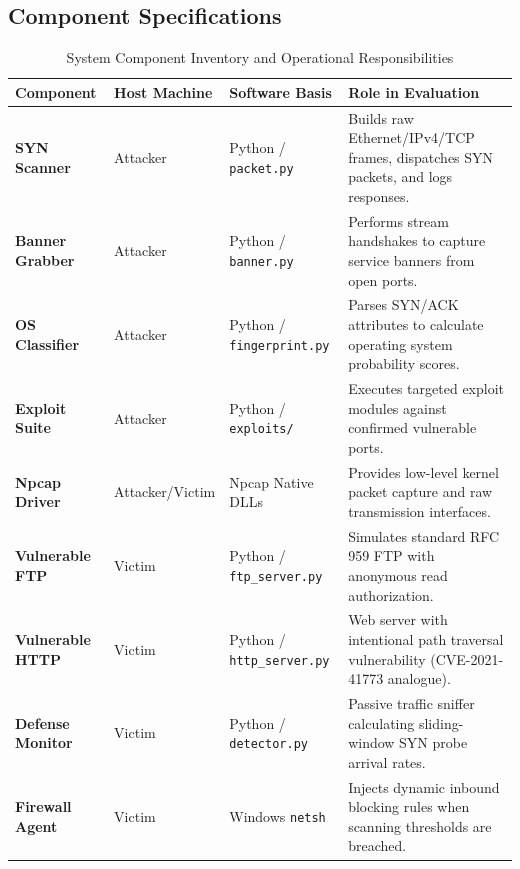 \documentclass[11pt,a4paper]{article}
\begin{document}
\subsection{Component Specifications}
\begin{table}[H]
\centering
\small
\renewcommand{\arraystretch}{1.24}
\caption{System Component Inventory and Operational Responsibilities}
\label{tab:components}
\begin{tabularx}{\textwidth}{>{\raggedright\arraybackslash\bfseries}p{2.8cm} >{\raggedright\arraybackslash}p{2.2cm} >{\raggedright\arraybackslash}p{4.2cm} >{\raggedright\arraybackslash}X}
\toprule
\textbf{Component} & \textbf{Host Machine} & \textbf{Software Basis} & \textbf{Role in Evaluation} \\
\midrule
SYN Scanner & Attacker & Python / \texttt{packet.py} & Builds raw Ethernet/IPv4/TCP frames, dispatches SYN packets, and logs responses. \\
\rowcolor{lightbg}
Banner Grabber & Attacker & Python / \texttt{banner.py} & Performs stream handshakes to capture service banners from open ports. \\
OS Classifier & Attacker & Python / \texttt{fingerprint.py} & Parses SYN/ACK attributes to calculate operating system probability scores. \\
\rowcolor{lightbg}
Exploit Suite & Attacker & Python / \texttt{exploits/} & Executes targeted exploit modules against confirmed vulnerable ports. \\
Npcap Driver & Attacker/Victim & Npcap Native DLLs & Provides low-level kernel packet capture and raw transmission interfaces. \\
\rowcolor{lightbg}
Vulnerable FTP & Victim & Python / \texttt{ftp\_server.py} & Simulates standard RFC 959 FTP with anonymous read authorization. \\
Vulnerable HTTP & Victim & Python / \texttt{http\_server.py} & Web server with intentional path traversal vulnerability (CVE-2021-41773 analogue). \\
\rowcolor{lightbg}
Defense Monitor & Victim & Python / \texttt{detector.py} & Passive traffic sniffer calculating sliding-window SYN probe arrival rates. \\
Firewall Agent & Victim & Windows \texttt{netsh} & Injects dynamic inbound blocking rules when scanning thresholds are breached. \\
\bottomrule
\end{tabularx}
\end{table}
\end{document}
